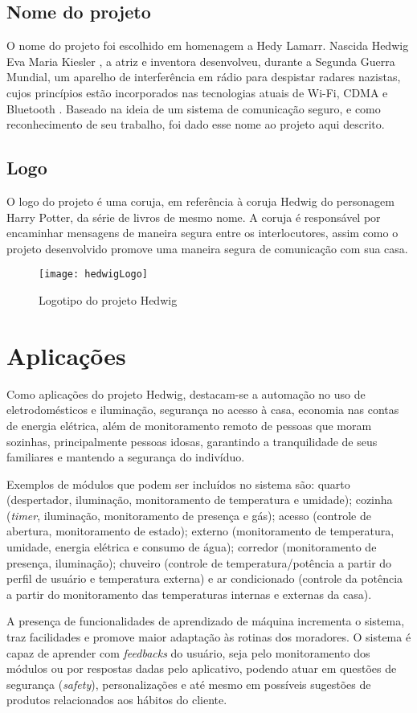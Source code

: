 \subsection{Nome do projeto}
O nome do projeto foi escolhido em homenagem a Hedy Lamarr. Nascida Hedwig Eva Maria Kiesler \cite{shearer}, a atriz e inventora desenvolveu, durante a Segunda Guerra Mundial, um aparelho de interferência em rádio para despistar radares nazistas, cujos princípios estão incorporados nas tecnologias atuais de Wi-Fi, CDMA e Bluetooth \cite{electronicFrontier}. Baseado na ideia de um sistema de comunicação seguro, e como reconhecimento de seu trabalho, foi dado esse nome ao projeto aqui descrito.

\subsection{Logo}
O logo do projeto é uma coruja, em referência à coruja Hedwig do personagem Harry Potter, da série de livros de mesmo nome. A coruja é responsável por encaminhar mensagens de maneira segura entre os interlocutores, assim como o projeto desenvolvido promove uma maneira segura de comunicação com sua casa.

\begin{figure}[H]
	\centering
	\caption{Logotipo do projeto Hedwig}
  \texttt{[image: hedwigLogo]}
\label{fig:hedwigLogo}
\end{figure}

\section{Aplicações}
Como aplicações do projeto Hedwig, destacam-se a automação no uso de eletrodomésticos e iluminação, segurança no acesso à casa, economia nas contas de energia elétrica, além de  monitoramento remoto de pessoas que moram sozinhas, principalmente pessoas idosas, garantindo a tranquilidade de seus familiares e mantendo a segurança do indivíduo.

Exemplos de módulos que podem ser incluídos no sistema são: quarto (despertador, iluminação, monitoramento de temperatura e umidade); cozinha (\textit{timer}, iluminação, monitoramento de presença e gás); acesso (controle de abertura, monitoramento de estado); externo (monitoramento de temperatura, umidade, energia elétrica e consumo de água); corredor (monitoramento de presença, iluminação); chuveiro (controle de temperatura\slash potência a partir do perfil de usuário e temperatura externa) e ar condicionado (controle da potência a partir do monitoramento das temperaturas internas e externas da casa).

A presença de funcionalidades de aprendizado de máquina incrementa o sistema, traz facilidades e promove maior adaptação às rotinas dos moradores. O sistema é capaz de aprender com \emph{feedbacks} do usuário, seja pelo monitoramento dos módulos ou por respostas dadas pelo aplicativo, podendo atuar em questões de segurança (\emph{safety}), personalizações e até mesmo em possíveis sugestões de produtos relacionados aos hábitos do cliente.
